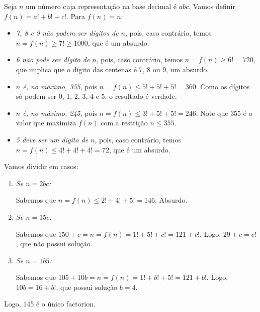Seja $n$ um número cuja representação na base decimal é $abc$. Vamos definir $f(n) = a! + b! + c!$. Para $f(n) = n$:

\begin{itemize}
	\item \textsl{7, 8 e 9 não podem ser dígitos de $n$}, pois, caso contrário, temos $n = f(n) \ge 7! \ge 1000$, que é um absurdo.
	\item \textsl{6 não pode ser dígito de $n$}, pois, caso contrário, temos $n = f(n) \ge 6! = 720$, que implica que o dígito das centenas é 7, 8 ou 9, um absurdo.
	\item \textsl{$n$ é, no máximo, 355}, pois $n = f(n) \le 5! + 5! + 5! = 360$. Como os dígitos só podem ser 0, 1, 2, 3, 4 e 5, o resultado é verdade.
	\item \textsl{$n$ é, no máximo, 245}, pois $n = f(n) \le 3! + 5! + 5! = 246$. Note que $355$ é o valor que maximiza $f(n)$ com a restrição $n \le 355$.
	\item \textsl{5 deve ser um dígito de $n$}, pois, caso contrário, temos $n = f(n) \le 4! + 4! + 4! = 72$, que é um absurdo.
\end{itemize}

Vamos dividir em casos:

\begin{enumerate}[label = --]
	\item \textsl{Se $n = 2bc$:}

		Sabemos que $n = f(n) \le 2! + 4! + 5! = 146$. Absurdo.

	\item \textsl{Se $n = 15c$:}

		Sabemos que $150 + c = n = f(n) = 1! + 5! + c! = 121 + c!$. Logo, $29 + c = c!$, que não possui solução.
	
	\item \textsl{Se $n = 1b5$:}

		Sabemos que $105 + 10b = n = f(n) = 1! + b! + 5! = 121 + b!$. Logo, $10b = 16 + b!$, que possui solução $b = 4$.
\end{enumerate}

Logo, 145 é o único factorion.
